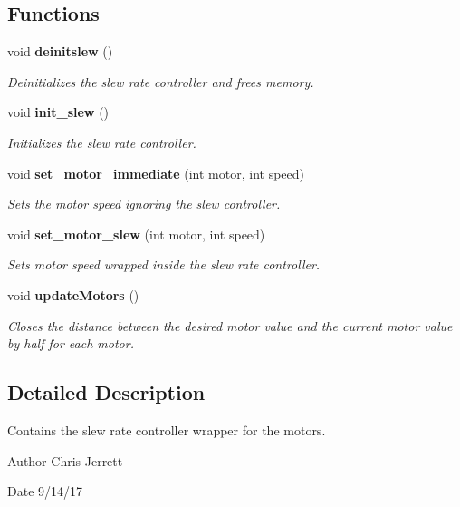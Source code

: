 \subsection*{Functions}
\begin{DoxyCompactItemize}
\item 
void \textbf{ deinitslew} ()
\begin{DoxyCompactList}\small\item\em Deinitializes the slew rate controller and frees memory. \end{DoxyCompactList}\item 
void \textbf{ init\+\_\+slew} ()
\begin{DoxyCompactList}\small\item\em Initializes the slew rate controller. \end{DoxyCompactList}\item 
void \textbf{ set\+\_\+motor\+\_\+immediate} (int motor, int speed)
\begin{DoxyCompactList}\small\item\em Sets the motor speed ignoring the slew controller. \end{DoxyCompactList}\item 
void \textbf{ set\+\_\+motor\+\_\+slew} (int motor, int speed)
\begin{DoxyCompactList}\small\item\em Sets motor speed wrapped inside the slew rate controller. \end{DoxyCompactList}\item 
void \textbf{ update\+Motors} ()
\begin{DoxyCompactList}\small\item\em Closes the distance between the desired motor value and the current motor value by half for each motor. \end{DoxyCompactList}\end{DoxyCompactItemize}


\subsection{Detailed Description}
Contains the slew rate controller wrapper for the motors. 

\begin{DoxyAuthor}{Author}
Chris Jerrett 
\end{DoxyAuthor}
\begin{DoxyDate}{Date}
9/14/17 
\end{DoxyDate}


